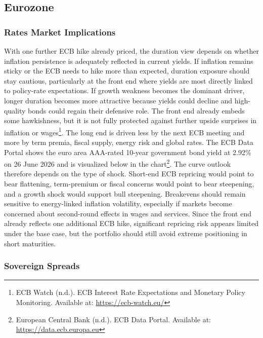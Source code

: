 \documentclass[11pt,a4paper]{article}
\begin{document}
\subsection{Eurozone}

\subsubsection{Rates Market Implications}

With one further ECB hike already priced, the duration view depends on whether inflation persistence is adequately reflected in current yields. If inflation remains sticky or the ECB needs to hike more than expected, duration exposure should stay cautious, particularly at the front end where yields are most directly linked to policy-rate expectations. If growth weakness becomes the dominant driver, longer duration becomes more attractive because yields could decline and high-quality bonds could regain their defensive role. The front end already embeds some hawkishness, but it is not fully protected against further upside surprises in inflation or wages\footnote{ECB Watch (n.d.). ECB Interest Rate Expectations and Monetary Policy Monitoring. Available at: \url{https://ecb-watch.eu/}}. The long end is driven less by the next ECB meeting and more by term premia, fiscal supply, energy risk and global rates. The ECB Data Portal shows the euro area AAA-rated 10-year government bond yield at 2.92\% on 26 June 2026 and is visualized below in the chart\footnote{European Central Bank (n.d.). ECB Data Portal. Available at: \url{https://data.ecb.europa.eu}}. The curve outlook therefore depends on the type of shock. Short-end ECB repricing would point to bear flattening, term-premium or fiscal concerns would point to bear steepening, and a growth shock would support bull steepening. Breakevens should remain sensitive to energy-linked inflation volatility, especially if markets become concerned about second-round effects in wages and services. Since the front end already reflects one additional ECB hike, significant repricing risk appears limited under the base case, but the portfolio should still avoid extreme positioning in short maturities.


\subsubsection{Sovereign Spreads}
\end{document}
